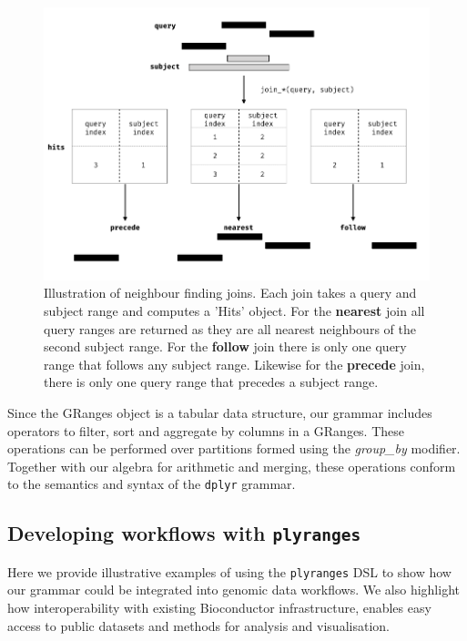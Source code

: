 \documentclass[]{article}
\begin{document}
\begin{figure}

{\centering \includegraphics[width=\textwidth]{diagrams/diagrams-003} 

}

\caption{Illustration of neighbour finding joins. Each join takes a query and subject range and computes a 'Hits' object. For the \textbf{nearest} join all query ranges are returned as they are all nearest neighbours of the second subject range. For the \textbf{follow} join there is only one query range that follows any subject range. Likewise for the \textbf{precede} join, there is only one query range that precedes a subject range.}\label{fig:nn-fig}
\end{figure}

Since the GRanges object is a tabular data structure, our grammar
includes operators to filter, sort and aggregate by columns in a
GRanges. These operations can be performed over partitions formed using
the \emph{group\_by} modifier. Together with our algebra for arithmetic
and merging, these operations conform to the semantics and syntax of the
\texttt{dplyr} grammar.

\hypertarget{developing-workflows-with-plyranges}{%
\subsection{\texorpdfstring{Developing workflows with
\texttt{plyranges}}{Developing workflows with plyranges}}\label{developing-workflows-with-plyranges}}

Here we provide illustrative examples of using the \texttt{plyranges}
DSL to show how our grammar could be integrated into genomic data
workflows. We also highlight how interoperability with existing
Bioconductor infrastructure, enables easy access to public datasets and
methods for analysis and visualisation.
\end{document}
